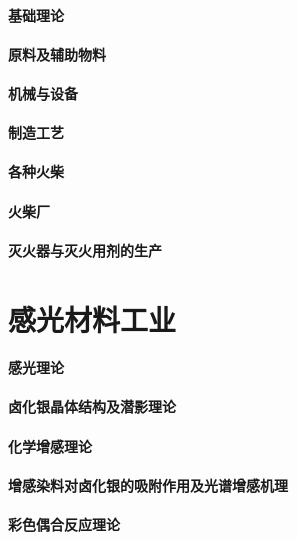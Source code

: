 \documentclass[UTF8]{../../ApplicationUniverse}
\begin{document}
    \subsubsection{基础理论}
    \subsubsection{原料及辅助物料}
    \subsubsection{机械与设备}
    \subsubsection{制造工艺}
    \subsubsection{各种火柴}
    \subsubsection{火柴厂}
\subsubsection{灭火器与灭火用剂的生产}








\chapter{感光材料工业}
\subsubsection{感光理论}
    \subsubsection{卤化银晶体结构及潜影理论}
    \subsubsection{化学增感理论}
    \subsubsection{增感染料对卤化银的吸附作用及光谱增感机理}
    \subsubsection{彩色偶合反应理论}
\end{document}

